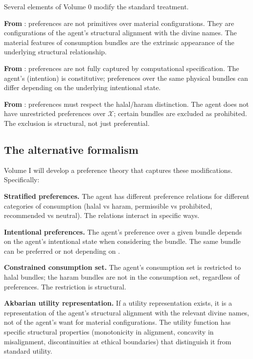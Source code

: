 Several elements of Volume 0 modify the standard treatment.

\textbf{From }: preferences are not
primitives over material configurations. They are configurations
of the agent's structural alignment with the divine names. The
material features of consumption bundles are the extrinsic
appearance of the underlying structural relationship.

\textbf{From }: preferences are not
fully captured by computational specification. The agent's
 (intention) is constitutive; preferences over the
same physical bundles can differ depending on the underlying
intentional state.

\textbf{From }: preferences must respect the
halal/haram distinction. The agent does not have unrestricted
preferences over $\mathcal{X}$; certain bundles are excluded as
prohibited. The exclusion is structural, not just preferential.

\subsection{The alternative formalism}

Volume I will develop a preference theory that captures these
modifications. Specifically:

\textbf{Stratified preferences.} The agent has different preference
relations for different categories of consumption (halal vs
haram, permissible vs prohibited, recommended vs neutral). The
relations interact in specific ways.

\textbf{Intentional preferences.} The agent's preference over a
given bundle depends on the agent's intentional state when
considering the bundle. The same bundle can be preferred or not
depending on .

\textbf{Constrained consumption set.} The agent's consumption set
is restricted to halal bundles; the haram bundles are not in the
consumption set, regardless of preferences. The restriction is
structural.

\textbf{Akbarian utility representation.} If a utility
representation exists, it is a representation of the agent's
structural alignment with the relevant divine names, not of the
agent's want for material configurations. The utility function
has specific structural properties (monotonicity in alignment,
concavity in misalignment, discontinuities at ethical boundaries)
that distinguish it from standard utility.

